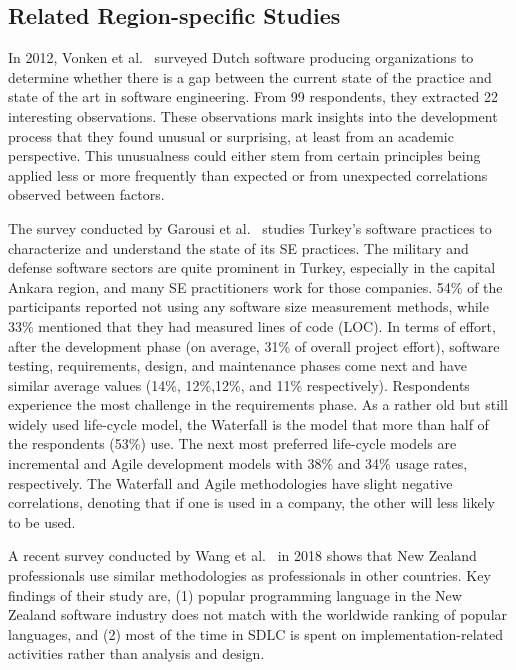 \subsection{Related Region-specific Studies}
\label{region specific study}

In 2012, Vonken et al.~\cite{Vonken2012} surveyed Dutch software producing organizations to determine whether there is a gap between the current state of the practice and state of the art in software engineering. From 99 respondents, they extracted 22 interesting observations. These observations mark insights into the development process that they found unusual or surprising, at least from an academic perspective. This unusualness could either stem from certain principles being applied less or more frequently than expected or from unexpected correlations observed between factors.

The survey conducted by Garousi et al.~\cite{Garousi2015} studies Turkey's software practices to characterize and understand the state of its SE practices. The military and defense software sectors are quite prominent in Turkey, especially in the capital Ankara region, and many SE practitioners work for those companies. 54\% of the participants reported not using any software size measurement methods, while 33\% mentioned that they had measured lines of code (LOC). In terms of effort, after the development phase (on average, 31\% of overall project effort), software testing, requirements, design, and maintenance phases come next and have similar average values (14\%, 12\%,12\%, and 11\% respectively). Respondents experience the most challenge in the requirements phase. As a rather old but still widely used life-cycle model, the Waterfall is the model that more than half of the respondents (53\%) use. The next most preferred life-cycle models are incremental and Agile development models with 38\% and 34\% usage rates, respectively. The Waterfall and Agile methodologies have slight negative correlations, denoting that if one is used in a company, the other will less likely to be used.


A recent survey conducted by Wang et al.~\cite{Wang2018} in 2018 shows that New Zealand professionals use similar methodologies as professionals in other countries. Key findings of their study are, (1) popular programming language in the New Zealand software industry does not match with the worldwide ranking of popular languages, and (2) most of the time in SDLC is spent on implementation-related activities rather than analysis and design.


